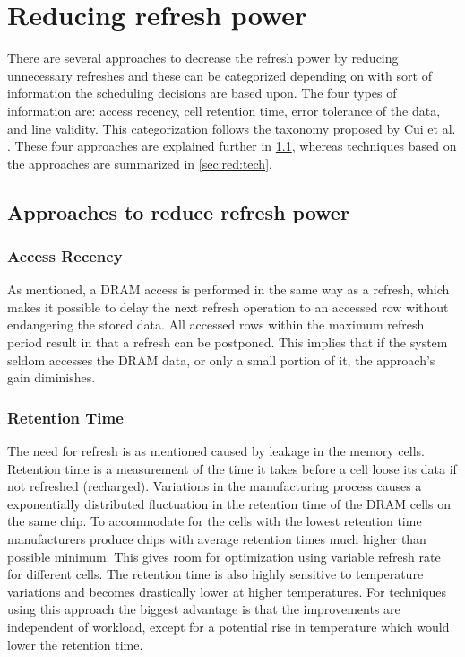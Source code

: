 \section{Reducing refresh power} 
\label{sec:red}
There are several approaches to decrease the refresh power by reducing unnecessary refreshes and these can be categorized depending on with sort of information the scheduling decisions are based upon. The four types of information are: access recency, cell retention time, error tolerance of the data, and line validity. This categorization follows the taxonomy proposed by Cui et al. \cite{dtail}. These four approaches are explained further in \ref{sec:red:app}, whereas techniques based on the approaches are summarized in \ref{sec:red:tech}. 

\subsection{Approaches to reduce refresh power}
\label{sec:red:app}

\subsubsection*{\textbf{Access Recency}}
As mentioned, a DRAM access is performed in the same way as a refresh, which makes it possible to delay the next refresh operation to an accessed row without endangering the stored data. All accessed rows within the maximum refresh period result in that a refresh can be postponed. This implies that if the system seldom accesses the DRAM data, or only a small portion of it, the approach's gain diminishes.


\subsubsection*{\textbf{Retention Time}}
The need for refresh is as mentioned caused by leakage in the memory cells. Retention time is a measurement of the time it takes before a cell loose its data if not refreshed (recharged). Variations in the manufacturing process causes a exponentially distributed fluctuation \cite{katayama} in the retention time of the DRAM cells on the same chip. To accommodate for the cells with the lowest retention time manufacturers produce chips with average retention times much higher than possible minimum. This gives room for optimization using variable refresh rate for different cells. The retention time is also highly sensitive to temperature variations and becomes drastically lower at higher temperatures. For techniques using this approach the biggest advantage is that the improvements are independent of workload, except for a potential rise in temperature which would lower the retention time.

